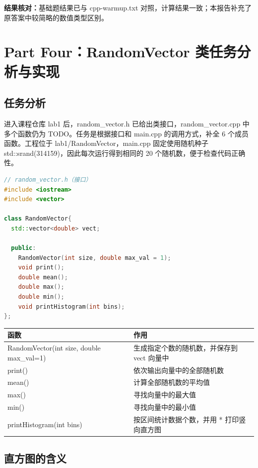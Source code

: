 \documentclass[12pt,a4paper]{ctexart}
\begin{document}
\textbf{结果核对：}基础题结果已与 cpp-warmup.txt 对照，计算结果一致；本报告补充了原答案中较简略的数值类型区别。

\newpage

\section{Part Four：RandomVector 类任务分析与实现}

\subsection{任务分析}

进入课程仓库 lab1 后，random\_vector.h 已给出类接口，random\_vector.cpp 中多个函数仍为 TODO。任务是根据接口和 main.cpp 的调用方式，补全 6 个成员函数。工程位于 lab1/RandomVector，main.cpp 固定使用随机种子 std::srand(314159)，因此每次运行得到相同的 20 个随机数，便于检查代码正确性。

\begin{lstlisting}[language=C++]
// random_vector.h（接口）
#include <iostream>
#include <vector>

class RandomVector{
  std::vector<double> vect;

  public:
    RandomVector(int size, double max_val = 1);
    void print();
    double mean();
    double max();
    double min();
    void printHistogram(int bins);
};
\end{lstlisting}

\begin{center}
\begin{tabular}{p{5.4cm}p{8.6cm}}
\toprule
函数 & 作用 \\
\midrule
RandomVector(int size, double max\_val=1) & 生成指定个数的随机数，并保存到 vect 向量中 \\
print() & 依次输出向量中的全部随机数 \\
mean() & 计算全部随机数的平均值 \\
max() & 寻找向量中的最大值 \\
min() & 寻找向量中的最小值 \\
printHistogram(int bins) & 按区间统计数据个数，并用 * 打印竖向直方图 \\
\bottomrule
\end{tabular}
\end{center}

\subsection{直方图的含义}
\end{document}
